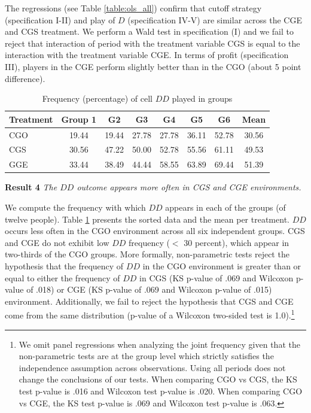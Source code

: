 \documentclass[12pt, letterpaper]{article}
\theoremstyle{plain}
\begin{document}
The regressions (see Table \ref{table:ols_all}) confirm that cutoff strategy (specification I-II) and play of $D$ (specification IV-V) are similar across the CGE and CGS treatment. We perform a Wald test in specification (I) and we fail to reject that interaction of period with the treatment variable CGS is equal to the interaction with  the treatment variable CGE. In terms of profit (specification III), players in the CGE perform slightly better than in the CGO (about 5 point difference).\\

\begin{table}[!t]
\centering
\caption{Frequency (percentage) of cell $DD$ played in groups }
\begin{tabular}{lccccccc}
\hline
Treatment & Group 1 & G2  & G3 & G4 & G5 & G6 & Mean\\
  \hline
  CGO &  19.44 & 19.44&  27.78 & 27.78 & 36.11 & 52.78 & 30.56 \\
  CGS & 30.56 & 47.22&  50.00 & 52.78 & 55.56 & 61.11 & 49.53\\
  GGE & 33.44 & 38.49 & 44.44 & 58.55 & 63.89 & 69.44 & 51.39 \\
  \hline

\end{tabular}

\label{table:dd}
\end{table}

\noindent \textbf{Result 4}
\textit{The $DD$ outcome appears more often in CGS and CGE environments.}

We compute the frequency with which $DD$ appears in each of the groups (of twelve people). Table \ref{table:dd} presents the sorted data and the mean per treatment. $DD$ occurs less often in the CGO environment across all six independent groups. CGS and CGE do not exhibit low $DD$ frequency ($<$ 30 percent), which appear in two-thirds of the CGO groups. More formally, non-parametric tests reject the hypothesis that the frequency of $DD$ in the CGO environment is greater than or equal to either the frequency of $DD$ in CGS (KS p-value of .069 and Wilcoxon p-value of .018) or CGE (KS p-value of .069 and Wilcoxon p-value of .015) environment. Additionally, we fail to reject the hypothesis that CGS and CGE come from the same distribution (p-value of a Wilcoxon two-sided test is 1.0).\footnote{We omit panel regressions when analyzing the joint frequency given that the non-parametric tests are at the group level which strictly satisfies the independence assumption across observations. Using all periods does not change the conclusions of our tests. When comparing CGO vs CGS, the KS test p-value is .016 and Wilcoxon test p-value is .020. When comparing CGO vs CGE, the KS test p-value is .069 and Wilcoxon test p-value is .063. }\\
\end{document}
